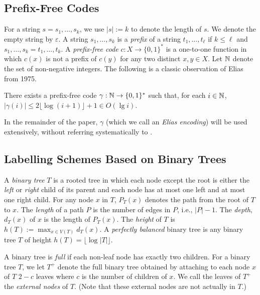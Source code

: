 \documentclass[kpfonts]{patmorin}
\let\le\leqslant
\begin{document}
\subsection{Prefix-Free Codes}

For a string $s=s_1,\ldots,s_k$, we use $|s|:=k$ to denote the length of $s$. 
We denote the empty string by $\varepsilon$. 
A string $s_1,\ldots,s_k$ is a \emph{prefix} of a string $t_1,\ldots,t_\ell$ if $k\le \ell$ and $s_1,\ldots,s_k=t_1,\ldots,t_k$.  A \emph{prefix-free code} $c:X\to\{0,1\}^*$ is a one-to-one function in which $c(x)$ is not a prefix of $c(y)$ for any two distinct $x,y\in X$.  Let $\mathbb{N}$ denote the set of non-negative integers.  The following is a classic observation of Elias from 1975.


\begin{lem}
    There exists a prefix-free code $\gamma:\mathbb{N}\to\{0,1\}^*$ such that, for each $i\in\mathbb{N}$, $|\gamma(i)|\le 2\lfloor\log(i+1)\rfloor + 1\in O(\lg i)$.
  \end{lem}

  In the remainder of the paper, $\gamma$ (which we call an \emph{Elias encoding}) will be used extensively, without referring systematically to .

\subsection{Labelling Schemes Based on Binary Trees}

A \emph{binary tree} $T$ is a rooted tree in which each node except the root is either the \emph{left} or \emph{right} child of its parent and each node has at most one left and at most one right child.  For any node $x$ in $T$, $P_T(x)$ denotes the path from the root of $T$ to $x$.  The \emph{length} of a path $P$ is the number of edges in $P$, i.e., $|P|-1$.  The \emph{depth}, $d_T(x)$ of $x$ is the length of $P_T(x)$.  The \emph{height} of $T$ is $h(T):=\max_{x\in V(T)} d_T(x)$.  A \emph{perfectly balanced} binary tree is any binary tree $T$ of height $h(T)=\lfloor\log|T|\rfloor$.

A binary tree is \emph{full} if each non-leaf node has exactly two children. For a binary tree $T$, we let $T^+$ denote the full binary tree obtained by attaching to each node $x$ of $T$ $2-c$ leaves where $c$ is the number of children of $x$.  We call the leaves of $T^+$ the \emph{external nodes} of $T$.  (Note that these external nodes are not actually in $T$.)
\end{document}
